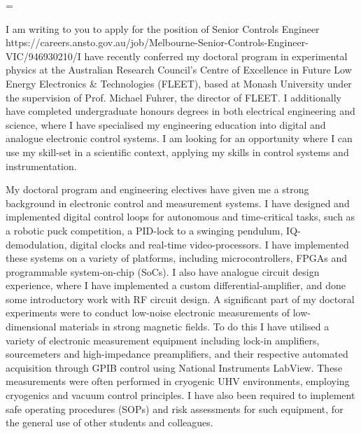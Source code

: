 \documentclass[10pt,a4paper,ragged2e,withhyper,paragraphstrue]{altacv}
\newcommand{\textalignment}{
    \tolerance=1 %
    \emergencystretch=\maxdimen
    \hyphenpenalty=10000 
    \hbadness=10000
}
\newcommand{\pind}{\hspace{24pt}}
\begin{document}
    

    \vspace{1em}

    {
    \textalignment
    \pind I am writing to you to apply for the position of Senior Controls Engineer
    {https://careers.ansto.gov.au/job/Melbourne-Senior-Controls-Engineer-VIC/946930210/}I have recently conferred my doctoral program in experimental physics at the Australian Research Council's Centre of Excellence in 
    Future Low Energy Electronics \& Technologies (FLEET), based at Monash University under the supervision of Prof. Michael Fuhrer, 
    the director of FLEET. I additionally have completed undergraduate honours degrees in both electrical engineering and science, where I have specialised my 
    engineering education into digital and analogue electronic control systems. I am looking for an opportunity where I can
    use my skill-set in a scientific context, applying my skills in control systems and instrumentation. 

    \pind My doctoral program and engineering electives have given me a strong background in electronic control and measurement systems. I have designed and implemented 
    digital control loops for autonomous and time-critical tasks, such as a robotic puck competition, a PID-lock to a swinging pendulum, IQ-demodulation,
    digital clocks and real-time video-processors. I have implemented these systems on a variety of platforms, including microcontrollers, FPGAs and 
    programmable system-on-chip (SoCs). I also have analogue circuit design experience, where I have implemented a custom differential-amplifier, 
    and done some introductory work with RF circuit design.
    A significant part of my doctoral experiments were to conduct low-noise electronic measurements of low-dimensional materials in strong magnetic fields. 
    To do this I have utilised a variety of electronic measurement equipment including lock-in amplifiers, sourcemeters and high-impedance preamplifiers, and their 
    respective automated acquisition through GPIB control using National Instruments LabView. These measurements were often performed in cryogenic UHV environments, 
    employing cryogenics and vacuum control principles. I have also been required to implement safe operating procedures (SOPs) and risk assessments for such equipment, 
    for the general use of other students and colleagues.

}
\end{document}
